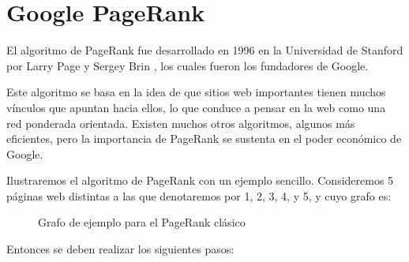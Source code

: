 \chapter{Google PageRank}

El algoritmo de PageRank fue desarrollado en 1996 en la Universidad de Stanford por Larry Page y Sergey Brin \cite{Brin_1998}, los cuales fueron los fundadores de Google.

Este algoritmo se basa en la idea de que sitios web importantes tienen muchos vínculos que apuntan hacia ellos, lo que conduce a pensar en la web como una red ponderada orientada. Existen muchos otros algoritmos, algunos más eficientes, pero la importancia de PageRank se sustenta en el poder económico de Google.

Ilustraremos el algoritmo de PageRank con un ejemplo sencillo. Consideremos 5 páginas web distintas a las que denotaremos por 1, 2, 3, 4, y 5, y cuyo grafo es:

\begin{figure}[H]
    \centering
    \caption[Grafo de ejemplo para el PageRank clásico]{Grafo de ejemplo para el PageRank clásico}
    \label{fig:examplegraph}
\end{figure}

Entonces se deben realizar los siguientes pasos:

